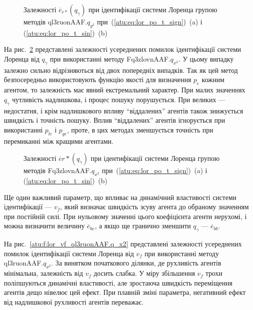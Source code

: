 \begin{figure}[htb!]
  \caption{Залежності $\overline{e}_{r *}(q_\gamma) $ при ідентифікації системи Лоренца групою методів ql3ruonAAF.$q_{y^2} $ при~(\ref{atu:eq:lor_po_t_sign})~(a) і (\ref{atu:eq:lor_po_t_sin})~(b)}
  \label{atu:f:lor_qg_ql3ruonAAF.q_y2}
\end{figure}


На рис.~\ref{atu:f:lor_qg_Fq3zlovnAAF.q_x2} представлені залежності усереднених
помилок ідентифікації системи Лоренца від
$q_\gamma $ при використанні методу
Fq3zlovnAAF.$q_{x^2}$.
У цьому випадку залежно сильно відрізняються від двох
попередніх випадків. Так як цей метод безпосередньо
використовують функцію якості для визначення
$p_e $ кожним агентом, то залежність має явний екстремальний
характер. При малих значеннях
$q_\gamma $ чутливість надлишкова, і процес пошуку порушується. При
великих --- недостатня, і крім надлишкового впливу ``віддалених''
агентів також знижується швидкість і точність пошуку. Вплив
``віддалених'' агентів ігнорується при використанні
$p_{le}$ і
$p_{qe}$, проте, в цих методах зменшується точність при перемиканні
між кращими агентами.


\begin{figure}[htb!]
  \caption{Залежності $\overline{e}{r *} (q_\gamma)$ при ідентифікації системи Лоренца групою методів Fq3zlovnAAF.$q_{x^2} $ при~(\ref{atu:eq:lor_po_t_sign})~(a) і (\ref{atu:eq:lor_po_t_sin})~(b)}
  \label{atu:f:lor_qg_Fq3zlovnAAF.q_x2}
\end{figure}


Ще один важливий параметр, що впливає на динамічний властивості
системи ідентифікації ---
$v_f $, який визначає швидкість зсуву агента до обраному значенням
при постійній силі. При нульовому значенні цього коефіцієнта
агенти нерухомі, і можна визначити величину
$\overline{e}_{be} $, а якщо ще гранично зменшити
$q_\gamma $ ---
$\overline{e}_{bb} $.



На рис.~\ref{atu:f:lor_vf_ql3ruonAAF.q_x2} представлені залежності усереднених
помилок ідентифікації системи Лоренца від
$v_f $ при використанні методу
ql3ruonAAF.$q_{x^2}$.
За винятком початкового ділянки, де рухливість агентів
мінімальна, залежність від
$v_f $ досить слабка. У міру збільшення
$v_f $ трохи поліпшуються динамічні властивості, але зростаюча
швидкість переміщення агентів дещо нівелює цей ефект. При
плавній зміні параметра, негативний ефект від надлишкової
рухливості агентів переважає.

